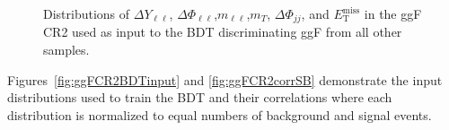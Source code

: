 \begin{figure}[!h]
  \hfill
{\caption{Distributions of $\Delta Y_{\ell\ell}$, $\Delta \Phi_{\ell\ell}$,$m_{\ell\ell}$,$m_T$, $\Delta \Phi_{jj}$, and $\ensuremath{E_{\text{T}}^{\text{miss}}}$ in the ggF CR2 used as input to the BDT discriminating ggF from all other samples.
\label{fig:ggFCR2}}}
\end{figure} 

Figures~\ref{fig:ggFCR2BDTinput} and \ref{fig:ggFCR2corrSB} demonstrate the input distributions used to train the BDT and their correlations where each distribution is normalized to equal numbers of background and signal events.

